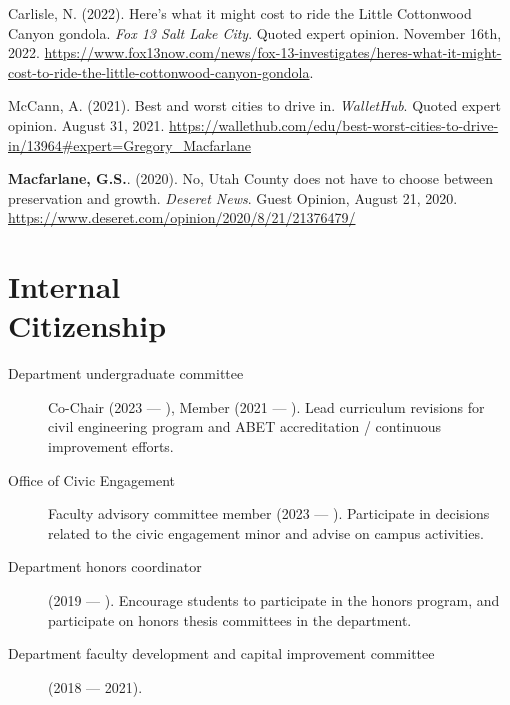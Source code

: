 \documentclass[margin,line]{res}
\begin{document}
\begin{resume}
Carlisle, N. (2022). Here’s what it might cost to ride the Little Cottonwood Canyon gondola. \textit{Fox 13 Salt Lake City}. Quoted expert opinion. November 16th, 2022. \url{https://www.fox13now.com/news/fox-13-investigates/heres-what-it-might-cost-to-ride-the-little-cottonwood-canyon-gondola}.

McCann, A. (2021). Best and worst cities to drive in. \textit{WalletHub}. Quoted expert opinion. August 31, 2021. \url{https://wallethub.com/edu/best-worst-cities-to-drive-in/13964#expert=Gregory_Macfarlane}

\textbf{Macfarlane, G.S.}. (2020). No, Utah County does not have to choose between preservation and growth. \textit{Deseret News}. Guest Opinion, August 21, 2020. \url{https://www.deseret.com/opinion/2020/8/21/21376479/}

\section{Internal \\ Citizenship}
\begin{description}
  \item[Department undergraduate committee] Co-Chair (2023 --- ), Member (2021 --- ). Lead curriculum revisions for civil engineering program and ABET accreditation / continuous improvement efforts.
  \item[Office of Civic Engagement] Faculty advisory committee member (2023 --- ). Participate in decisions related to the civic engagement minor and advise on campus activities.
  \item[Department honors coordinator] (2019 --- ). Encourage students to
  participate in the honors program, and participate on honors thesis committees
  in the department.
  \item[Department faculty development and capital improvement committee] (2018 --- 2021).
\end{description}






\end{resume}
\end{document}
